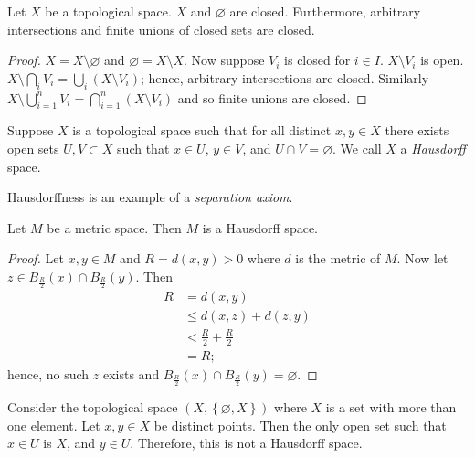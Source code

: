 

\begin{lemma}[]
	Let $X$ be a topological space.
	$X$ and $\varnothing$ are closed.
	Furthermore, arbitrary intersections and finite unions of closed sets are
	closed.
\end{lemma}

\begin{proof}
	$X = X \setminus \varnothing$ and $\varnothing = X \setminus X$.
	Now suppose $V_i$ is closed for $i \in I$.
	$X \setminus V_i$ is open.
	$X \setminus \bigcap_i V_i = \bigcup_i \left( X \setminus V_i \right)$;
	hence, arbitrary intersections are closed.
	Similarly
	$X \setminus \bigcup_{i = 1}^n V_i = \bigcap_{i=1}^n (X \setminus V_i)$
	and so finite unions are closed.
\end{proof}

\begin{definition}[]
	Suppose $X$ is a topological space such that for all distinct $x,y \in X$
	there exists open sets $U, V \subset X$ such that $x \in U$, $y \in V$, and
	$U \cap V = \varnothing$.
	We call $X$ a \emph{Hausdorff} space.
\end{definition}

Hausdorffness is an example of a \emph{separation axiom}.

\begin{lemma}[]
	Let $M$ be a metric space.
	Then $M$ is a Hausdorff space.
\end{lemma}

\begin{proof}
	Let $x, y \in M$ and $R = d(x,y) > 0$ where $d$ is the metric of $M$.
	Now let $z \in B_{\frac R2}(x) \cap B_{\frac R2}(y)$.
	Then
	\begin{align*}
		R
		&= d(x,y) \\
		&\leq d(x,z) + d(z,y) \\
		&< \frac R2 + \frac R2 \\
		&= R;
	\end{align*}
	hence, no such $z$ exists and 
	$B_{\frac R2}(x) \cap B_{\frac R2}(y) = \varnothing$.
\end{proof}

\begin{example}[]
	Consider the topological space $(X, \left\{ \varnothing, X \right\})$ where
	$X$ is a set with more than one element.
	Let $x, y \in X$ be distinct points. 
	Then the only open set such that $x \in U$ is $X$, and $y \in U$.
	Therefore, this is not a Hausdorff space.
\end{example}

